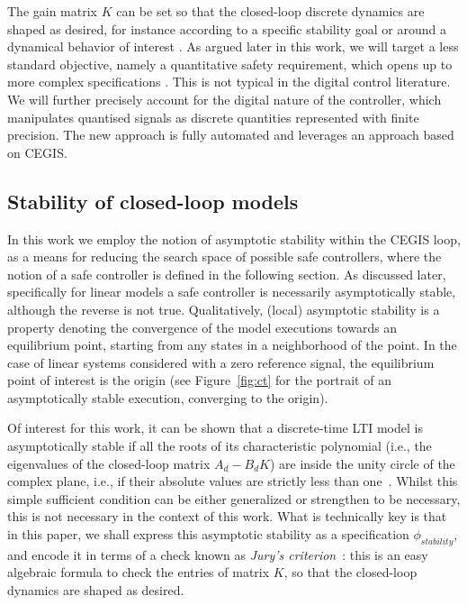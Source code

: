 The gain matrix $K$ can be set so that the closed-loop discrete dynamics are
shaped as desired, for instance according to a specific stability goal or
around a dynamical behavior of interest \cite{astrom1997computer}.  As argued
later in this work, we will target a less standard objective,
namely a quantitative safety requirement, which opens up to more complex specifications \cite{BYG16, Tab09}. 
This is not typical in the digital control literature. We will further precisely account for the digital nature
of the controller, which manipulates quantised signals as discrete quantities represented with
finite precision. The new approach is fully automated and leverages an approach based on CEGIS. 


\subsection{Stability of closed-loop models}

In this work we employ the notion of asymptotic stability within the CEGIS loop,  
as a means for reducing the search space of possible safe controllers, where the notion of a safe controller
is defined in the following section. 
As discussed later, specifically for linear models a safe controller is necessarily asymptotically stable, 
although the reverse is not true. 
Qualitatively, (local) asymptotic stability is a property denoting the convergence of the model executions towards an equilibrium point, 
starting from any states in a neighborhood of the point. 
In the case of linear systems %
considered with a zero reference signal, 
the equilibrium point of interest is the origin (see Figure~\ref{fig:ct} for the portrait of an asymptotically stable execution, converging to the origin). 

Of interest for this work, 
it can be shown that a discrete-time LTI model %
is asymptotically stable if all the roots of its characteristic polynomial (i.e., the
eigenvalues of the closed-loop matrix $A_d - B_d K$) are inside the unity
circle of the complex plane, i.e., if their absolute values are strictly less than
one~\cite{astrom1997computer}. 
Whilst this simple sufficient condition can be either generalized or strengthen to be necessary, 
this is not necessary in the context of this work.    
What is technically key is that in this paper, 
we shall express this asymptotic stability as a specification $\phi_\mathit{stability}$, 
and encode it in terms of a check known as \emph{Jury's criterion}~\cite{fadali}: 
this is an easy algebraic formula to check the entries of matrix $K$, 
so that the closed-loop dynamics are shaped as desired. 

